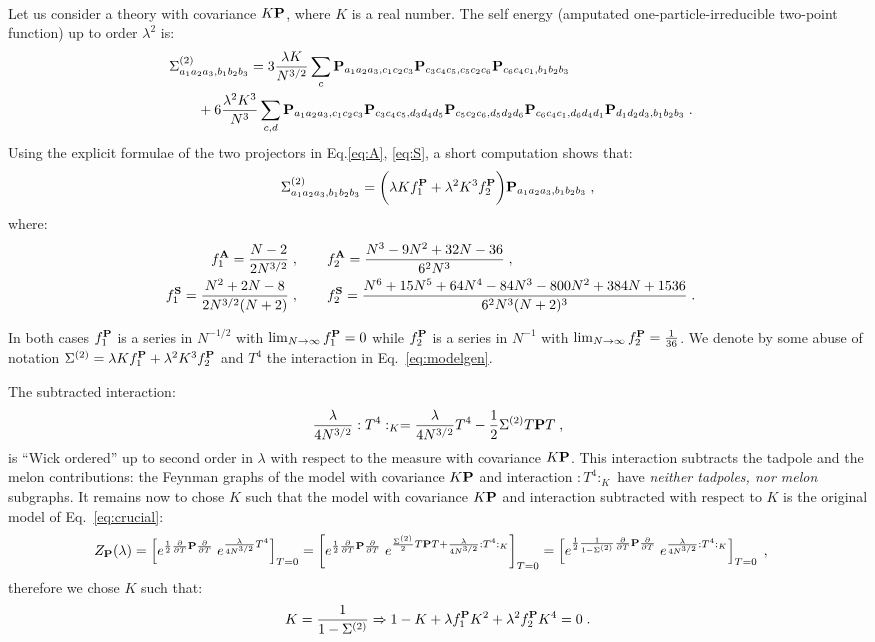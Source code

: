 \documentclass[10pt]{article}
\theoremstyle{plain}
\theoremstyle{definition}
\newcommand{\bP}{ {\bf P} }
\newcommand{\bA}{ {\bf A} }
\newcommand{\bS}{ {\bf S} }
\begin{document}
\

Let us consider a theory with covariance $K\bP$, where $K$ is a real number. The self energy (amputated  one-particle-irreducible two-point function) up to order $\lambda^2$ is:
\begin{align*}
 &  \Sigma^{(2)}_{a_1a_2a_3,b_1b_2b_3}  = 3 \frac{\lambda K}{N^{3/2}} \sum_{c} \bP_{a_1a_2a_3, c_1c_2c_3} \bP_{c_3c_4c_5, c_5c_2c_6} \bP_{c_6 c_4 c_1,b_1b_2b_3}   \crcr
 & \qquad   + 6 \frac{\lambda^2 K^3}{N^3}
     \sum_{c,d} \bP_{a_1a_2a_3, c_1 c_2c_3}    \bP_{c_3 c_4 c_5, d_3 d_4 d_5 } \bP_{c_5c_2 c_6 , d_5 d_2 d_6 } \bP_{c_6c_4c_1 ,  d_6 d_4 d_1  } \bP_{ d_1 d_2 d_3 , b_1b_2b_3} \;.
\end{align*}
Using the explicit formulae of the two projectors in Eq.\eqref{eq:A}, \eqref{eq:S}, a short computation shows that:
\[
 \Sigma^{(2)}_{a_1a_2a_3,b_1b_2b_3} =  \bigg(  \lambda K f^{\bP}_1  +    \lambda^2 K^3 f_2^{\bP}   \bigg) \bP_{a_1a_2a_3,b_1b_2b_3} \;,
\]
where:
\begin{align*}
    f_1^{\bA}   =    \frac{N-2}{ 2 N^{3/2}}  & \;, \qquad f_2^{\bA}  =  \frac{N^3 - 9 N^2 +32N-36 }{6^2   N^3 }  \;,  \crcr
    f_1^{\bS}   =   \frac{N^2+2N-8}{ 2 N^{3/2} (N+2)} & \;, \qquad f_2^{\bS}  =  \frac{N^6 +15 N^5 + 64N^4 -84N^3 -800N^2 +384 N +1536}{6^2 N^3 ( N+2)^3}  \;.
\end{align*}

In both cases $f_1^{\bP}$ is a series in $N^{- 1/2 }$ with $\lim_{N\to \infty } f_1^{\bP} = 0 $ while $f_2^{\bP}$ is a series in $N^{-1}$ with $  \lim_{N\to \infty} f_2^{\bP}  =  \frac{1}{36} $.
We denote by some abuse of notation $ \Sigma^{(2)  }=   \lambda K f_1^{\bP} +   \lambda^2 K^3 f_2^{\bP}$ and $T^4$ the interaction in Eq.~\eqref{eq:modelgen}. 

The subtracted interaction:
\[ \frac{ \lambda }{4 N^{3/2}} : T^4:_K =  \frac{ \lambda }{4 N^{3/2} } T^4 -  \frac{1}{2} \Sigma^{(2)} T \bP T  \;, \]
is ``Wick ordered'' up to second order in $\lambda$ with respect to the measure with covariance $K\bP$.
This interaction subtracts the tadpole and the melon contributions: the Feynman graphs of the model
with covariance  $K\bP$ and interaction $: T^4:_K $ have \emph{neither tadpoles, nor melon} subgraphs. 
It remains now to chose $K$ such that the model with covariance $K\bP$ and interaction subtracted with respect to $K$
is the original model of Eq.~\eqref{eq:crucial}:
\begin{align*}
  Z_{\bP}(\lambda) & = \left[  e^{\frac{1}{2} \frac{\partial}{\partial T}  \bP  \frac{\partial}{\partial T}  }  \; e^{  \frac{\lambda}{4 N^{3/2}} T^4}\right]_{T=0} = 
  \left[  e^{\frac{1}{2} \frac{\partial}{\partial T}  \bP  \frac{\partial}{\partial T}  }  \; e^{  \frac{   \Sigma^{(2)}  }{2}  T \bP T +  \frac{\lambda}{4 N^{3/2}} : T^4:_K }\right]_{T=0}  =
   \left[  e^{\frac{1}{2} \frac{1}{1 - \Sigma^{(2) }} \frac{\partial}{\partial T}  \bP \frac{\partial}{\partial T}  }  \; e^{  \frac{\lambda}{4 N^{3/2}} : T^4:_K }\right]_{T=0}   \;,
\end{align*}
therefore we chose $K$ such that: 
\[
 K = \frac{1}{  1 - \Sigma^{(2)}  } \Rightarrow   1 - K + \lambda f_1^{\bP}  K^2  +   \lambda^2 f_2^{\bP}  K^4  =0 \; . 
\]
\end{document}
